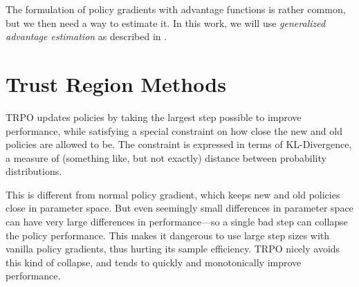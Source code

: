 The formulation of policy gradients with advantage functions is rather common, but we then need a way to estimate it. In this work, we will use \textit{generalized advantage estimation} as described in \cite{https://doi.org/10.48550/arxiv.1506.02438}.

\section{Trust Region Methods}
TRPO updates policies by taking the largest step possible to improve performance, while satisfying a special constraint on how close the new and old policies are allowed to be. The constraint is expressed in terms of KL-Divergence, a measure of (something like, but not exactly) distance between probability distributions.

This is different from normal policy gradient, which keeps new and old policies close in parameter space. But even seemingly small differences in parameter space can have very large differences in performance—so a single bad step can collapse the policy performance. This makes it dangerous to use large step sizes with vanilla policy gradients, thus hurting its sample efficiency. TRPO nicely avoids this kind of collapse, and tends to quickly and monotonically improve performance.

